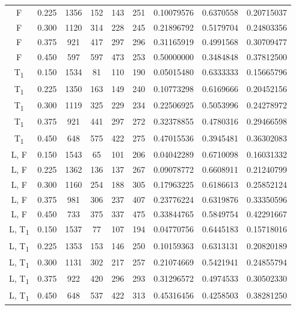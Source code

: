{\begin{landscape}
\begin{tabular}{ccccccccc}
            F & 0.225 & 1356 & 152 & 143 & 251 & 0.10079576 & 0.6370558 & 0.20715037 \\
            F & 0.300 & 1120 & 314 & 228 & 245 & 0.21896792 & 0.5179704 & 0.24803356 \\
            F & 0.375 & 921 & 417 & 297 & 296 & 0.31165919 & 0.4991568 & 0.30709477 \\
            F & 0.450 & 597 & 597 & 473 & 253 & 0.50000000 & 0.3484848 & 0.37812500 \\
            T\textsubscript{1} & 0.150 & 1534 & 81 & 110 & 190 & 0.05015480 & 0.6333333 & 0.15665796 \\
            T\textsubscript{1} & 0.225 & 1350 & 163 & 149 & 240 & 0.10773298 & 0.6169666 & 0.20452156 \\
            T\textsubscript{1} & 0.300 & 1119 & 325 & 229 & 234 & 0.22506925 & 0.5053996 & 0.24278972 \\
            T\textsubscript{1} & 0.375 & 921 & 441 & 297 & 272 & 0.32378855 & 0.4780316 & 0.29466598 \\
            T\textsubscript{1} & 0.450 & 648 & 575 & 422 & 275 & 0.47015536 & 0.3945481 & 0.36302083 \\
            L, F & 0.150 & 1543 & 65 & 101 & 206 & 0.04042289 & 0.6710098 & 0.16031332 \\
            L, F & 0.225 & 1362 & 136 & 137 & 267 & 0.09078772 & 0.6608911 & 0.21240799 \\
            L, F & 0.300 & 1160 & 254 & 188 & 305 & 0.17963225 & 0.6186613 & 0.25852124 \\
            L, F & 0.375 & 981 & 306 & 237 & 407 & 0.23776224 & 0.6319876 & 0.33350596 \\
            L, F & 0.450 & 733 & 375 & 337 & 475 & 0.33844765 & 0.5849754 & 0.42291667 \\
            L, T\textsubscript{1} & 0.150 & 1537 & 77 & 107 & 194 & 0.04770756 & 0.6445183 & 0.15718016 \\
            L, T\textsubscript{1} & 0.225 & 1353 & 153 & 146 & 250 & 0.10159363 & 0.6313131 & 0.20820189 \\
            L, T\textsubscript{1} & 0.300 & 1131 & 302 & 217 & 257 & 0.21074669 & 0.5421941 & 0.24855794 \\
            L, T\textsubscript{1} & 0.375 & 922 & 420 & 296 & 293 & 0.31296572 & 0.4974533 & 0.30502330 \\
            L, T\textsubscript{1} & 0.450 & 648 & 537 & 422 & 313 & 0.45316456 & 0.4258503 & 0.38281250 \\

\end{tabular}
\end{landscape}}
